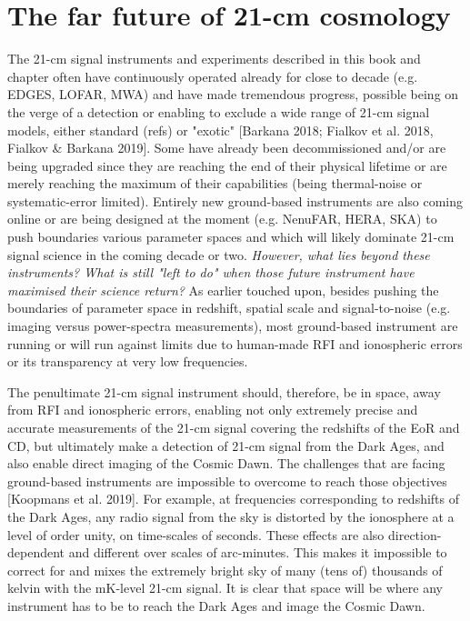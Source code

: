 \section{The far future of 21-cm cosmology}

The 21-cm signal instruments and experiments described in this book and chapter often have continuously operated already for close to decade (e.g. EDGES, LOFAR, MWA) and have made tremendous progress, possible being on the verge of a detection or enabling to exclude a wide range of 21-cm signal models, either standard (refs) or "exotic" [Barkana 2018; Fialkov et al. 2018, Fialkov \& Barkana 2019]. Some have already been decommissioned and/or are being upgraded since they are reaching the end of their physical lifetime or are merely reaching the maximum of their capabilities (being thermal-noise or systematic-error limited). Entirely new ground-based instruments are also coming online or are being designed at the moment (e.g. NenuFAR, HERA, SKA) to push boundaries various parameter spaces and which will likely dominate 21-cm signal science in the coming decade or two. {\sl However, what lies beyond these instruments? What is still "left to do" when those future instrument have maximised their science return?} As earlier touched upon, besides pushing the boundaries of parameter space in redshift, spatial scale and signal-to-noise (e.g. imaging versus power-spectra measurements), most ground-based instrument are running or will run against limits due to human-made RFI and ionospheric errors or its transparency at very low frequencies. 

The penultimate 21-cm signal instrument should, therefore, be in space, away from RFI and ionospheric errors, enabling not only extremely precise and accurate measurements of the 21-cm signal covering the redshifts of the EoR and CD, but ultimately make a detection of 21-cm signal from the Dark Ages, and also enable direct imaging of the Cosmic Dawn. The challenges that are facing ground-based instruments are impossible to overcome to reach those objectives [Koopmans et al. 2019]. For example, at frequencies corresponding to redshifts of the Dark Ages, any radio signal from the sky is distorted by the ionosphere at a level of order unity, on time-scales of seconds. These effects are also direction-dependent and different over scales of arc-minutes. This makes it impossible to correct for and mixes the extremely bright sky of many (tens of) thousands of kelvin with the mK-level 21-cm signal. It is clear that space will be where any instrument has to be to reach the Dark Ages and image the Cosmic Dawn.


